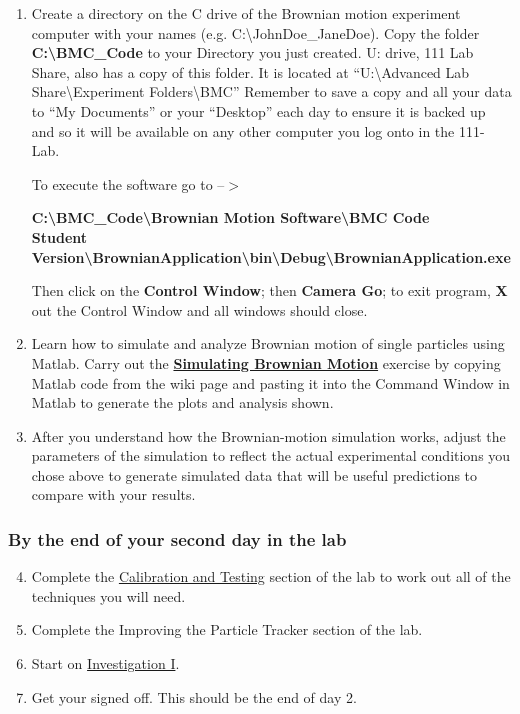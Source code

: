 \documentclass{../lab}
\begin{document}
\begin{enumerate}
    \item Create a directory on the C drive of the Brownian motion experiment computer with your names (e.g. C:\textbackslash  JohnDoe\_JaneDoe). Copy the folder \textbf{C:\textbackslash  BMC\_Code }to your Directory you just created.  U: drive, 111 Lab Share, also has a copy of this folder. It is located at ``U:\textbackslash  Advanced Lab Share\textbackslash  Experiment Folders\textbackslash  BMC'' Remember to save a copy and all your data to ``My Documents'' or your ``Desktop'' each day to ensure it is backed up and so it will be available on any other computer you log onto in the 111-Lab.

    To execute the software go to --$>$
    
    \textbf{C:\textbackslash  BMC\_Code\textbackslash  Brownian Motion Software\textbackslash  BMC Code \\
    Student Version\textbackslash  BrownianApplication\textbackslash  bin\textbackslash  Debug\textbackslash  BrownianApplication.exe}
    
    Then click on the \textbf{Control Window}; then \textbf{Camera Go}; to exit program, \textbf{X} out the Control Window and all windows should close.
    
    \item Learn how to simulate and analyze Brownian motion of single particles using Matlab. Carry out the \href{http://experimentationlab.berkeley.edu/node/83}{\textbf{Simulating Brownian Motion}} exercise by copying Matlab code from the wiki page and pasting it into the Command Window in Matlab to generate the plots and analysis shown.
    
    \item After you understand how the Brownian-motion simulation works, adjust the parameters of the simulation to reflect the actual experimental conditions you chose above to generate simulated data that will be useful predictions to compare with your results.
\end{enumerate}

\subsubsection{By the end of your second day in the lab}

\begin{enumerate}
    \setcounter{enumi}{3}
    \item Complete the \hyperref[sec:CalibrationAndTesting]{Calibration and Testing} section of the lab to work out all of the techniques you will need.

    \item Complete the Improving the Particle Tracker section of the lab.
    
    \item Start on  \hyperref[sec:InvestigationI]{Investigation I}.
    
    \item Get your \href{\sig}{} signed off. This should be the end of day 2.
\end{enumerate}
\end{document}
